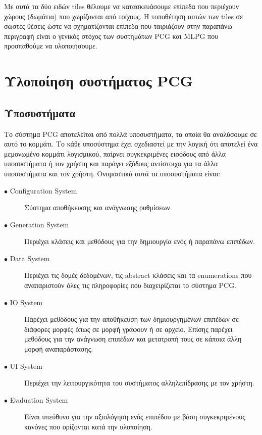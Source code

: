 Με αυτά τα δύο ειδών tiles θέλουμε να κατασκευάσουμε επίπεδα που περιέχουν χώρους (δωμάτια) που χωρίζονται από τοίχους. Η τοποθέτηση αυτών των tiles σε σωστές θέσεις ώστε να σχηματίζονται επίπεδα που ταιριάζουν στην παραπάνω περιγραφή είναι ο γενικός στόχος των συστημάτων PCG και MLPG που προσπαθούμε να υλοποιήσουμε.

\section{Υλοποίηση συστήματος PCG}

\subsection{Υποσυστήματα}
Το σύστημα PCG αποτελείται από πολλά υποσυστήματα, τα οποία θα αναλύσουμε σε αυτό το κομμάτι. Το κάθε υποσύστημα έχει σχεδιαστεί με την λογική ότι αποτελεί ένα μεμονωμένο κομμάτι λογισμικού, παίρνει συγκεκριμένες εισόδους από άλλα υποσυστήματα ή τον χρήστη και παράγει εξόδους αντίστοιχα για τα άλλα υποσυστήματα και τον χρήστη. Ονομαστικά αυτά τα υποσυστήματα είναι:

\begin{description}
\item[$\bullet$ Configuration System] Σύστημα αποθήκευσης και ανάγνωσης ρυθμίσεων.
\item[$\bullet$ Generation System] Περιέχει κλάσεις και μεθόδους για την δημιουργία ενός ή παραπάνω επιπέδων.
\item[$\bullet$ Data System] Περιέχει τις δομές δεδομένων, τις abstract κλάσεις και τα enumerations που αναπαριστούν όλες τις πληροφορίες που διαχειρίζεται το σύστημα PCG.
\item[$\bullet$ IO System] Παρέχει μεθόδους για την αποθήκευση των δημιουργημένων επιπέδων σε διάφορες μορφές όπως σε μορφή γράφουν ή σε αρχείο. Επίσης παρέχει μεθόδους για την ανάγνωση επιπέδων και μετατροπή τους σε κάποια άλλη μορφή αναπαράστασης.
\item[$\bullet$ UI System] Περιέχει την λειτουργικότητα του συστήματος αλληλεπίδρασης με τον χρήστη.
\item[$\bullet$ Evaluation System] Είναι υπεύθυνο για την αξιολόγηση ενός επιπέδου με βάση συγκεκριμένους κανόνες που ορίζονται κατά την υλοποίηση.
\end{description}

